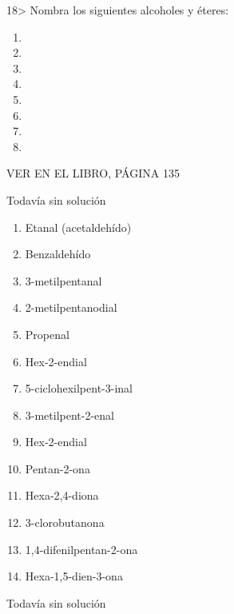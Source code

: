 \documentclass[twocolumn]{article}
\begin{document}
\begin{exercise}
  18> Nombra los siguientes alcoholes y éteres:
  \begin{enumerate}
    \item {}
    \item {}
    \item {}
    \item {}
    \item {}
    \item {}
    \item {}
    \item {}
  \end{enumerate}
  VER EN EL LIBRO, PÁGINA 135
\end{exercise}

\begin{solution}[print=false]
  Todavía sin solución
\end{solution}


\begin{exercise}
  \begin{enumerate}
    \item Etanal (acetaldehído)
    \item Benzaldehído
    \item 3-metilpentanal
    \item 2-metilpentanodial
    \item Propenal
    \item Hex-2-endial
    \item 5-ciclohexilpent-3-inal
    \item 3-metilpent-2-enal
    \item Hex-2-endial
    \item Pentan-2-ona
    \item Hexa-2,4-diona
    \item 3-clorobutanona
    \item 1,4-difenilpentan-2-ona
    \item Hexa-1,5-dien-3-ona
  \end{enumerate}
\end{exercise}

\begin{solution}[print=false]
  Todavía sin solución
\end{solution}
\end{document}
